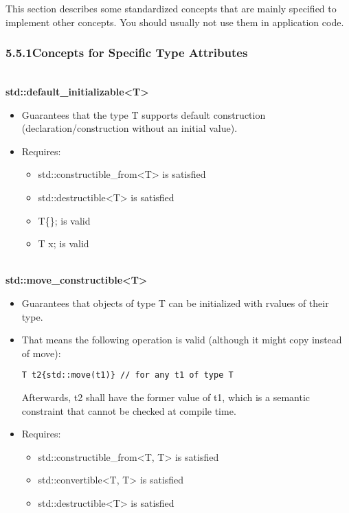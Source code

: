 

This section describes some standardized concepts that are mainly specified to implement other concepts. You should usually not use them in application code.


\subsubsection*{ 5.5.1\hspace{0.2cm}Concepts for Specific Type Attributes}

\noindent
\hspace*{\fill} \\ %
\textbf{std::default\_initializable<T>}

\begin{itemize}
\item
Guarantees that the type T supports default construction (declaration/construction without an initial value).

\item
Requires:
\begin{itemize}
\item
std::constructible\_from<T> is satisfied

\item
std::destructible<T> is satisfied

\item
T\{\}; is valid

\item
T x; is valid
\end{itemize}
\end{itemize}

\noindent
\hspace*{\fill} \\ %
\textbf{std::move\_constructible<T>}

\begin{itemize}
\item
Guarantees that objects of type T can be initialized with rvalues of their type.

\item
That means the following operation is valid (although it might copy instead of move):

\begin{lstlisting}[style=styleCXX]
T t2{std::move(t1)} // for any t1 of type T
\end{lstlisting}

Afterwards, t2 shall have the former value of t1, which is a semantic constraint that cannot be checked at compile time.

\item
Requires:
\begin{itemize}
\item
std::constructible\_from<T, T> is satisfied

\item
std::convertible<T, T> is satisfied

\item
std::destructible<T> is satisfied
\end{itemize}
\end{itemize}


